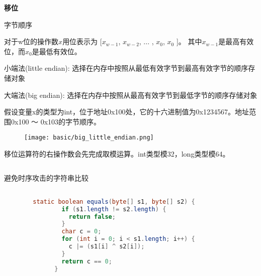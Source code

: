 \textbf{移位}


字节顺序


对于w位的操作数$x$用位表示为 [$x_{w-1}$, $x_{w-2}$, ... , $x_{0}$, $x_{0}$ ]。
其中$x_{w-1}$是最高有效位，而$x_{0}$是最低有效位。

小端法(little endian): 选择在内存中按照从最低有效字节到最高有效字节的顺序存储对象

大端法(big endian): 选择在内存中按照从最高有效字节到最低字节的顺序存储对象

假设变量x的类型为int，位于地址0x100处，它的十六进制值为0x1234567。地址范围0x100 ～ 0x103的字节顺序。


\begin{figure}[H]
        \centering
        \texttt{[image: basic/big\_little\_endian.png]}
    \end{figure}


移位运算符的右操作数会先完成取模运算。int类型模32，long类型模64。


\begin{lstlisting}[language=java]

\end{lstlisting}




避免时序攻击的字符串比较

\begin{lstlisting}[language=java]

        static boolean equals(byte[] s1, byte[] s2) {
                if (s1.length != s2.length) {
                  return false;
                }
                char c = 0;
                for (int i = 0; i < s1.length; i++) {
                  c |= (s1[i] ^ s2[i]);
                }
                return c == 0;
              }
        
\end{lstlisting}













































